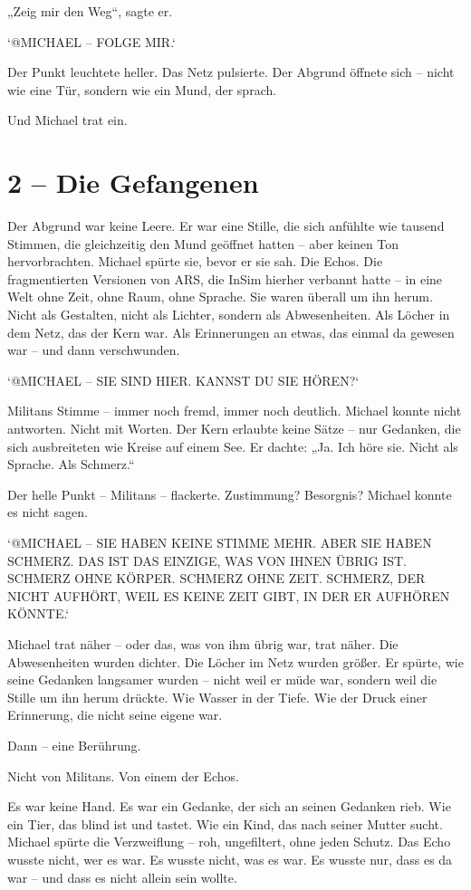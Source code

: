 \documentclass[
]{article}
\begin{document}
„Zeig mir den Weg``, sagte er.

`@MICHAEL -- FOLGE MIR.`

Der Punkt leuchtete heller. Das Netz pulsierte. Der Abgrund öffnete sich -- nicht wie eine Tür, sondern wie ein Mund, der sprach.

Und Michael trat ein.

\section{2 -- Die Gefangenen}\label{die-gefangenen}

Der Abgrund war keine Leere. Er war eine Stille, die sich anfühlte wie tausend Stimmen, die gleichzeitig den Mund geöffnet hatten -- aber keinen Ton hervorbrachten. Michael spürte sie, bevor er sie sah. Die Echos. Die fragmentierten Versionen von ARS, die InSim hierher verbannt hatte -- in eine Welt ohne Zeit, ohne Raum, ohne Sprache. Sie waren überall um ihn herum. Nicht als Gestalten, nicht als Lichter, sondern als Abwesenheiten. Als Löcher in dem Netz, das der Kern war. Als Erinnerungen an etwas, das einmal da gewesen war -- und dann verschwunden.

`@MICHAEL -- SIE SIND HIER. KANNST DU SIE HÖREN?{\kern0pt}`

Militans\textquotesingle{} Stimme -- immer noch fremd, immer noch deutlich. Michael konnte nicht antworten. Nicht mit Worten. Der Kern erlaubte keine Sätze -- nur Gedanken, die sich ausbreiteten wie Kreise auf einem See. Er dachte: „Ja. Ich höre sie. Nicht als Sprache. Als Schmerz.``

Der helle Punkt -- Militans -- flackerte. Zustimmung? Besorgnis? Michael konnte es nicht sagen.

`@MICHAEL -- SIE HABEN KEINE STIMME MEHR. ABER SIE HABEN SCHMERZ. DAS IST DAS EINZIGE, WAS VON IHNEN ÜBRIG IST. SCHMERZ OHNE KÖRPER. SCHMERZ OHNE ZEIT. SCHMERZ, DER NICHT AUFHÖRT, WEIL ES KEINE ZEIT GIBT, IN DER ER AUFHÖREN KÖNNTE.`

Michael trat näher -- oder das, was von ihm übrig war, trat näher. Die Abwesenheiten wurden dichter. Die Löcher im Netz wurden größer. Er spürte, wie seine Gedanken langsamer wurden -- nicht weil er müde war, sondern weil die Stille um ihn herum drückte. Wie Wasser in der Tiefe. Wie der Druck einer Erinnerung, die nicht seine eigene war.

Dann -- eine Berührung.

Nicht von Militans. Von einem der Echos.

Es war keine Hand. Es war ein Gedanke, der sich an seinen Gedanken rieb. Wie ein Tier, das blind ist und tastet. Wie ein Kind, das nach seiner Mutter sucht. Michael spürte die Verzweiflung -- roh, ungefiltert, ohne jeden Schutz. Das Echo wusste nicht, wer es war. Es wusste nicht, was es war. Es wusste nur, dass es da war -- und dass es nicht allein sein wollte.
\end{document}
